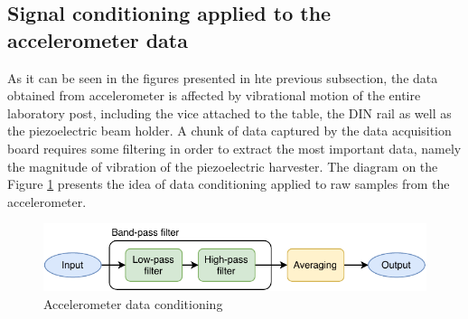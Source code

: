 \documentclass[12pt,a4paper]{article}
\begin{document}
\subsection{Signal conditioning applied to the accelerometer data}

As it can be seen in the figures presented in hte previous subsection, the data obtained from accelerometer is affected by vibrational motion of the entire laboratory post, including the vice attached to the table, the DIN rail as well as the piezoelectric beam holder. A chunk of data captured by the data acquisition board requires some filtering in order to extract the most important data, namely the magnitude of vibration of the piezoelectric harvester. The diagram on the Figure \ref{fig:accelsignal} presents the idea of data conditioning applied to raw samples from the accelerometer.

\begin{figure}[ht!]
\includegraphics[scale=1.0]{accelsignal.pdf}
\caption{Accelerometer data conditioning}
\label{fig:accelsignal}
\end{figure}
\end{document}
